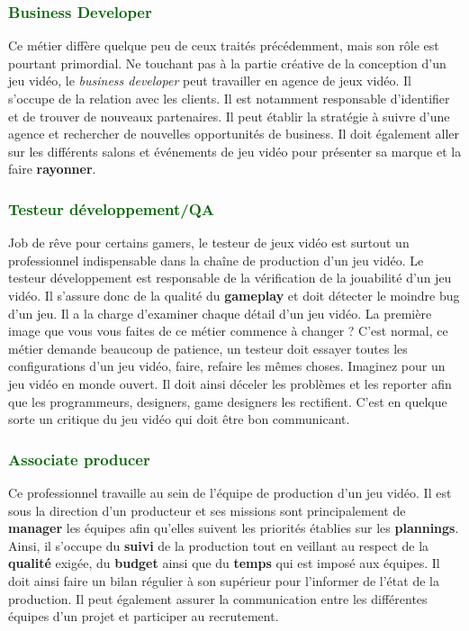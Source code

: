 \documentclass[ebook, 8pt, oneside, openany]{memoir}
\begin{document}
	\subsubsection{\textcolor{darkgreen}{Business Developer}}
	Ce métier diffère quelque peu de ceux traités précédemment, mais son rôle est pourtant primordial. Ne
	touchant pas à la partie créative de la conception d’un jeu vidéo, le \emph{business developer} peut 
	travailler en agence de jeux vidéo. Il s’occupe de la relation avec les clients. Il est notamment
	responsable d’identifier et de trouver de nouveaux partenaires. Il peut établir la stratégie à suivre
	d’une agence et rechercher de nouvelles opportunités de business. Il doit également aller sur les
	différents salons et événements de jeu vidéo pour présenter sa marque et la faire \textbf{rayonner}.
	\subsubsection{\textcolor{darkgreen}{Testeur développement/QA}}
	Job de rêve pour certains gamers, le testeur de jeux vidéo est surtout un professionnel indispensable
	dans la chaîne de production d’un jeu vidéo. Le testeur développement est responsable de la vérification 
	de la jouabilité d’un jeu vidéo. Il s’assure donc de la qualité du \textbf{gameplay} et doit détecter le 
	moindre bug d’un jeu. Il a la charge d'examiner chaque détail d’un jeu vidéo. La première image que vous 
	vous faites de ce métier commence à changer ? C’est normal, ce métier demande beaucoup de patience, un 
	testeur doit essayer toutes les configurations d’un jeu vidéo, faire, refaire les mêmes choses. Imaginez 
	pour un jeu vidéo en monde ouvert. Il doit ainsi déceler les problèmes et les reporter afin que les
	programmeurs, designers, game designers les rectifient. C’est en quelque sorte un critique du jeu vidéo 
	qui doit être bon communicant.
	\subsubsection{\textcolor{darkgreen}{Associate producer}}
	Ce professionnel travaille au sein de l’équipe de production d’un jeu vidéo. Il est sous la direction 
	d’un producteur et ses missions sont principalement de \textbf{manager} les équipes afin qu'elles 
	suivent les priorités établies sur les \textbf{plannings}. Ainsi, il s'occupe du \textbf{suivi} de la 
	production tout en veillant au respect de la \textbf{qualité} exigée, du \textbf{budget} ainsi que du 
	\textbf{temps} qui est imposé aux équipes. Il doit ainsi faire un bilan régulier à son supérieur pour 
	l’informer de l’état de la production. Il peut également assurer la communication entre les différentes 
	équipes d’un projet et participer au recrutement.
	
\end{document}

